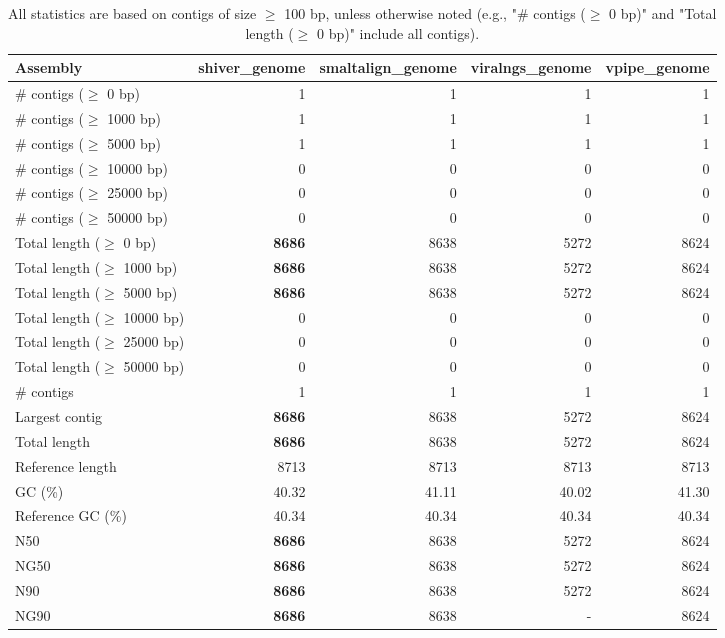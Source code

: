 \documentclass[12pt,a4paper]{article}
\begin{document}
\begin{table}[ht]
\begin{center}
\caption{All statistics are based on contigs of size $\geq$ 100 bp, unless otherwise noted (e.g., "\# contigs ($\geq$ 0 bp)" and "Total length ($\geq$ 0 bp)" include all contigs).}
\begin{tabular}{|l*{4}{|r}|}
\hline
Assembly & shiver\_genome & smaltalign\_genome & viralngs\_genome & vpipe\_genome \\ \hline
\# contigs ($\geq$ 0 bp) & 1 & 1 & 1 & 1 \\ \hline
\# contigs ($\geq$ 1000 bp) & 1 & 1 & 1 & 1 \\ \hline
\# contigs ($\geq$ 5000 bp) & 1 & 1 & 1 & 1 \\ \hline
\# contigs ($\geq$ 10000 bp) & 0 & 0 & 0 & 0 \\ \hline
\# contigs ($\geq$ 25000 bp) & 0 & 0 & 0 & 0 \\ \hline
\# contigs ($\geq$ 50000 bp) & 0 & 0 & 0 & 0 \\ \hline
Total length ($\geq$ 0 bp) & {\bf 8686} & 8638 & 5272 & 8624 \\ \hline
Total length ($\geq$ 1000 bp) & {\bf 8686} & 8638 & 5272 & 8624 \\ \hline
Total length ($\geq$ 5000 bp) & {\bf 8686} & 8638 & 5272 & 8624 \\ \hline
Total length ($\geq$ 10000 bp) & 0 & 0 & 0 & 0 \\ \hline
Total length ($\geq$ 25000 bp) & 0 & 0 & 0 & 0 \\ \hline
Total length ($\geq$ 50000 bp) & 0 & 0 & 0 & 0 \\ \hline
\# contigs & 1 & 1 & 1 & 1 \\ \hline
Largest contig & {\bf 8686} & 8638 & 5272 & 8624 \\ \hline
Total length & {\bf 8686} & 8638 & 5272 & 8624 \\ \hline
Reference length & 8713 & 8713 & 8713 & 8713 \\ \hline
GC (\%) & 40.32 & 41.11 & 40.02 & 41.30 \\ \hline
Reference GC (\%) & 40.34 & 40.34 & 40.34 & 40.34 \\ \hline
N50 & {\bf 8686} & 8638 & 5272 & 8624 \\ \hline
NG50 & {\bf 8686} & 8638 & 5272 & 8624 \\ \hline
N90 & {\bf 8686} & 8638 & 5272 & 8624 \\ \hline
NG90 & {\bf 8686} & 8638 & - & 8624 \\ \hline

\end{tabular}
\end{center}
\end{table}
\end{document}
